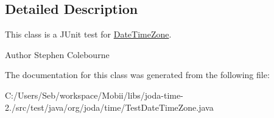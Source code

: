 \subsection{Detailed Description}
This class is a J\-Unit test for \hyperlink{classorg_1_1joda_1_1time_1_1_date_time_zone}{Date\-Time\-Zone}.

\begin{DoxyAuthor}{Author}
Stephen Colebourne 
\end{DoxyAuthor}


The documentation for this class was generated from the following file\-:\begin{DoxyCompactItemize}
\item 
C\-:/\-Users/\-Seb/workspace/\-Mobii/libs/joda-\/time-\/2./src/test/java/org/joda/time/Test\-Date\-Time\-Zone.\-java\end{DoxyCompactItemize}
